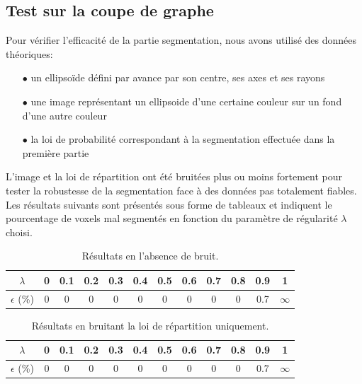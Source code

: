 \documentclass{article}
\begin{document}
\subsection{Test sur la coupe de graphe}
Pour vérifier l'efficacité de la partie segmentation, nous avons utilisé des données théoriques:
\begin{itemize}
	\item[$\bullet$] un ellipsoïde défini par avance par son centre, ses axes et ses rayons
	\item[$\bullet$] une image représentant un ellipsoide d'une certaine couleur sur un fond d'une autre couleur
	\item[$\bullet$] la loi de probabilité correspondant à la segmentation effectuée dans la première partie
\end{itemize} 
L'image et la loi de répartition ont été bruitées plus ou moins fortement pour tester la robustesse de la segmentation face à des données pas totalement fiables.\\
Les résultats suivants sont présentés sous forme de tableaux et indiquent le pourcentage de voxels mal segmentés en fonction du paramètre de régularité $\lambda$ choisi.

\begin{table}[h!]
\begin{center}
  \begin{tabular}{|c|c|c|c|c|c|c|c|c|c|c|c|}
		\hline
		$\lambda$ & 0 & 0.1& 0.2 & 0.3 & 0.4 & 0.5 & 0.6 & 0.7 & 0.8 & 0.9 & 1\\
		\hline
		$\epsilon$ (\%) & 0 & 0 & 0 & 0 & 0 & 0 & 0 & 0 & 0 & 0.7 & $\infty$\\
		\hline
\end{tabular}
\end{center}
\caption{Résultats en l'absence de bruit.}
\end{table}

\begin{table}[h!]
\begin{center}
  \begin{tabular}{|c|c|c|c|c|c|c|c|c|c|c|c|}
		\hline
		$\lambda$ & 0 & 0.1& 0.2 & 0.3 & 0.4 & 0.5 & 0.6 & 0.7 & 0.8 & 0.9 & 1\\
		\hline
		$\epsilon$ (\%) & 0 & 0 & 0 & 0 & 0 & 0 & 0 & 0 & 0 & 0.7 & $\infty$\\
		\hline
\end{tabular}
\end{center}
\caption{Résultats en bruitant la loi de répartition uniquement.}
\end{table}
\end{document}
